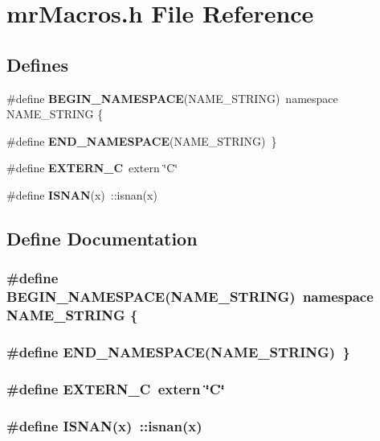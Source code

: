 \section{mr\-Macros.h File Reference}
\label{mrMacros_8h}
\subsection*{Defines}
\begin{CompactItemize}
\item 
\#define {\bf BEGIN\_\-NAMESPACE}(NAME\_\-STRING)\ namespace NAME\_\-STRING \{
\item 
\#define {\bf END\_\-NAMESPACE}(NAME\_\-STRING)\ \}
\item 
\#define {\bf EXTERN\_\-C}\ extern \char`\"{}C\char`\"{}
\item 
\#define {\bf ISNAN}(x)\ ::isnan(x)
\end{CompactItemize}


\subsection{Define Documentation}
\subsubsection{\setlength{\rightskip}{0pt plus 5cm}\#define BEGIN\_\-NAMESPACE(NAME\_\-STRING)\ namespace NAME\_\-STRING \{}\label{mrMacros_8h_a0}


\subsubsection{\setlength{\rightskip}{0pt plus 5cm}\#define END\_\-NAMESPACE(NAME\_\-STRING)\ \}}\label{mrMacros_8h_a1}


\subsubsection{\setlength{\rightskip}{0pt plus 5cm}\#define EXTERN\_\-C\ extern \char`\"{}C\char`\"{}}\label{mrMacros_8h_a2}


\subsubsection{\setlength{\rightskip}{0pt plus 5cm}\#define ISNAN(x)\ ::isnan(x)}\label{mrMacros_8h_a3}


